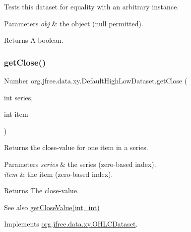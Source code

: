 Tests this dataset for equality with an arbitrary instance.


\begin{DoxyParams}{Parameters}
{\em obj} & the object ({\ttfamily null} permitted).\\
\hline
\end{DoxyParams}
\begin{DoxyReturn}{Returns}
A boolean. 
\end{DoxyReturn}
\mbox{\label{classorg_1_1jfree_1_1data_1_1xy_1_1_default_high_low_dataset_a12694885b103c14192fea35616c464f9}} 
\subsubsection{\texorpdfstring{get\+Close()}{getClose()}}
{\footnotesize\ttfamily Number org.\+jfree.\+data.\+xy.\+Default\+High\+Low\+Dataset.\+get\+Close (\begin{DoxyParamCaption}\item[{int}]{series,  }\item[{int}]{item }\end{DoxyParamCaption})}

Returns the close-\/value for one item in a series.


\begin{DoxyParams}{Parameters}
{\em series} & the series (zero-\/based index). \\
\hline
{\em item} & the item (zero-\/based index).\\
\hline
\end{DoxyParams}
\begin{DoxyReturn}{Returns}
The close-\/value.
\end{DoxyReturn}
\begin{DoxySeeAlso}{See also}
\mbox{\hyperlink{classorg_1_1jfree_1_1data_1_1xy_1_1_default_high_low_dataset_af316dffa7faed1c0c8c2f66b7b0acf5f}{get\+Close\+Value(int, int)}} 
\end{DoxySeeAlso}


Implements \mbox{\hyperlink{interfaceorg_1_1jfree_1_1data_1_1xy_1_1_o_h_l_c_dataset_a7c84699d1c3f6d5b4d1378d7b23d49ac}{org.\+jfree.\+data.\+xy.\+O\+H\+L\+C\+Dataset}}.

